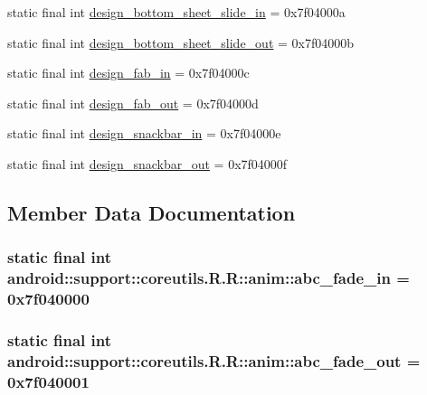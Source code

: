 \begin{CompactItemize}
\item 
static final int \hyperlink{classandroid_1_1support_1_1coreutils_1_1_r_1_1anim_6bd1f7215fc8cb8fc814ff4dce27d051}{design\_\-bottom\_\-sheet\_\-slide\_\-in} = 0x7f04000a
\item 
static final int \hyperlink{classandroid_1_1support_1_1coreutils_1_1_r_1_1anim_88779dbcc042a7cc7a263b4c29d2f09d}{design\_\-bottom\_\-sheet\_\-slide\_\-out} = 0x7f04000b
\item 
static final int \hyperlink{classandroid_1_1support_1_1coreutils_1_1_r_1_1anim_129f7358c87af2f779a1e5d1bff9fea8}{design\_\-fab\_\-in} = 0x7f04000c
\item 
static final int \hyperlink{classandroid_1_1support_1_1coreutils_1_1_r_1_1anim_01ee955012caffeec1067174f6c72349}{design\_\-fab\_\-out} = 0x7f04000d
\item 
static final int \hyperlink{classandroid_1_1support_1_1coreutils_1_1_r_1_1anim_74003a1796a5eb1cafc00f13868a75b6}{design\_\-snackbar\_\-in} = 0x7f04000e
\item 
static final int \hyperlink{classandroid_1_1support_1_1coreutils_1_1_r_1_1anim_040d81a644b105b9f2f8dce4b63b7ca5}{design\_\-snackbar\_\-out} = 0x7f04000f
\end{CompactItemize}


\subsection{Member Data Documentation}
\hypertarget{classandroid_1_1support_1_1coreutils_1_1_r_1_1anim_4c64d7d06c6244665bb049d0cdca2101}{
\subsubsection[{abc\_\-fade\_\-in}]{\setlength{\rightskip}{0pt plus 5cm}static final int android::support::coreutils.R.R::anim::abc\_\-fade\_\-in = 0x7f040000}}
\label{classandroid_1_1support_1_1coreutils_1_1_r_1_1anim_4c64d7d06c6244665bb049d0cdca2101}


\hypertarget{classandroid_1_1support_1_1coreutils_1_1_r_1_1anim_5564af8fb356892c2aee99588c59ba94}{
\subsubsection[{abc\_\-fade\_\-out}]{\setlength{\rightskip}{0pt plus 5cm}static final int android::support::coreutils.R.R::anim::abc\_\-fade\_\-out = 0x7f040001}}
\label{classandroid_1_1support_1_1coreutils_1_1_r_1_1anim_5564af8fb356892c2aee99588c59ba94}



